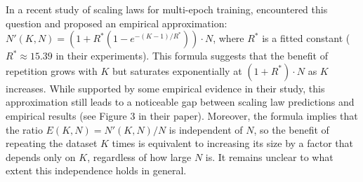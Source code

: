 
In a recent study of scaling laws for multi-epoch training, \citet{muennighoff2023scaling} encountered this question and proposed an empirical approximation: $N'(K, N) = \left(1 + R^* (1 - e^{-(K-1)/R^*})\right) \cdot N$,
where $R^*$ is a fitted constant ($R^* \approx 15.39$ in their experiments).
This formula suggests that the benefit of repetition grows with $K$ but saturates exponentially at $(1 + R^*) \cdot N$ as $K$ increases. While supported by some empirical evidence in their study, this approximation still leads to a noticeable gap between scaling law predictions and empirical results (see Figure 3 in their paper). Moreover, the formula implies that the ratio $E(K,N) = N'(K, N)/N$ is independent of $N$, so the benefit of repeating the dataset $K$ times is equivalent to increasing its size by a factor that depends only on $K$, regardless of how large $N$ is. It remains unclear to what extent this independence holds in general.



